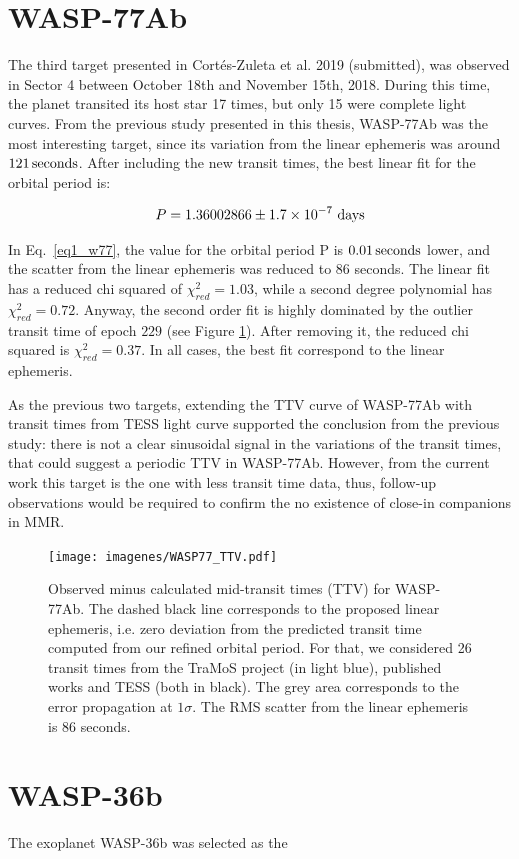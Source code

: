 \section{WASP-77Ab}

The third target presented in Cortés-Zuleta et al. 2019 (submitted), was observed in Sector 4 between October 18th and November 15th, 2018.  During this time, the planet transited its host star 17 times, but only 15 were complete light curves. From the previous study presented in this thesis, WASP-77Ab was the most interesting target, since its variation from the linear ephemeris was around  $121\,\rm seconds$.  After including the new transit times, the best linear fit for the orbital period is:

\begin{equation}
P = 1.36002866 \pm 1.7\times10^{-7} ~\rm days
\end{equation}

In Eq.~\ref{eq1_w77}, the value for the orbital period P is $0.01\,\rm seconds$ lower, and the scatter from the linear ephemeris was reduced to 86 seconds. The linear fit has a reduced chi squared of $\chi^2_{red}=1.03$, while a second degree polynomial has $\chi^2_{red}=0.72$. Anyway, the second order fit is highly dominated by the outlier transit time of epoch $229$ (see Figure \ref{wasp77_ttv}). After removing it, the reduced chi squared is  $\chi^2_{red}=0.37$. In all cases, the best fit correspond to the linear ephemeris.

As the previous two targets, extending the TTV curve of WASP-77Ab with transit times from TESS light curve supported the conclusion from the previous study: there is not a clear sinusoidal signal in the variations of the transit times, that could suggest a periodic TTV in WASP-77Ab. However, from the current work this target is the one with less transit time data, thus, follow-up observations would be required to confirm the no existence of close-in companions in MMR.


\begin{figure}[ht]
\texttt{[image: imagenes/WASP77\_TTV.pdf]}
\caption{Observed minus calculated mid-transit times (TTV) for WASP-77Ab. The dashed black line corresponds to the proposed linear ephemeris, i.e. zero deviation from the predicted transit time  computed from our refined orbital period. For that, we considered 26 transit times from the TraMoS project (in light blue), published works and TESS (both in black). The grey area corresponds to the error propagation at $1\sigma$. The RMS scatter from the linear ephemeris is 86 seconds.}
\label{wasp77_ttv}
\end{figure}


\section{WASP-36b}

The exoplanet WASP-36b was selected as the
